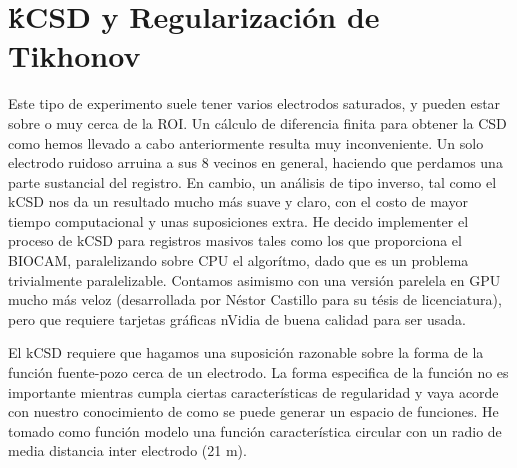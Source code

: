 \documentclass{article}
\begin{document}
\section{ḱCSD y Regularización de Tikhonov}

Este tipo de experimento suele tener varios electrodos saturados, y pueden
estar sobre o muy cerca de la ROI. Un cálculo de diferencia finita para
obtener la CSD como hemos llevado a cabo anteriormente resulta muy inconveniente. Un solo electrodo ruidoso arruina a sus 8 vecinos en general, haciendo
que perdamos una parte sustancial del registro. En cambio, un análisis
de tipo inverso, tal como el kCSD \cite{Potworowski2011} nos da un resultado
mucho más suave y claro, con el costo de mayor tiempo computacional y unas
suposiciones extra. He decido implementer el proceso de kCSD para
registros masivos tales como los que proporciona el BIOCAM, paralelizando
sobre CPU el algorítmo, dado que es un problema trivialmente paralelizable.
Contamos asimismo con una versión parelela en GPU mucho más veloz
(desarrollada por Néstor Castillo para su tésis de licenciatura), pero
que requiere tarjetas gráficas nVidia de buena calidad para ser usada.

El kCSD requiere que hagamos una suposición razonable sobre
la forma de la función fuente-pozo cerca de un electrodo. La forma especifica
de la función no es importante mientras cumpla ciertas características
de regularidad y vaya acorde con nuestro conocimiento de como se puede
generar un espacio de funciones. He tomado como función modelo
una función característica circular con un radio de
media distancia inter electrodo (21 \mu m).















\section{}
\end{document}
